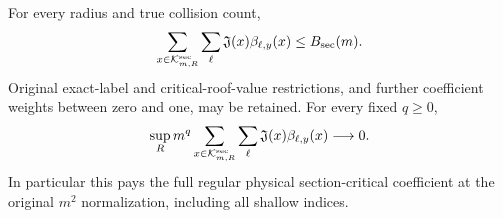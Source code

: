\begin{theorem}
\label{thm:scf-section-payment}
For every radius and true collision count,
\begin{equation}\label{eq:scf-section-payment}
 \sum_{x\in\mathcal K^{\rm sec}_{m,R}}\sum_\ell
       \mathfrak J(x)\beta_{\ell,y}(x)\le B_{\rm sec}(m).
\end{equation}
Original exact-label and critical-roof-value restrictions, and
further coefficient weights between zero and one, may be retained.
For every fixed $q\ge0$,
\begin{equation}\label{eq:scf-normalized}
 \sup_R m^q\sum_{x\in\mathcal K^{\rm sec}_{m,R}}\sum_\ell
       \mathfrak J(x)\beta_{\ell,y}(x)\longrightarrow0.
\end{equation}
In particular this pays the full regular physical section-critical coefficient
at the original $m^2$ normalization, including all shallow indices.
\end{theorem}
